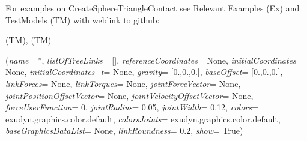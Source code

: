 %
\noindent For examples on CreateSphereTriangleContact see Relevant Examples (Ex) and TestModels (TM) with weblink to github:
\bi
 \item \footnotesize {} (TM), 
 (TM)
\ei

%
\begin{flushleft}
\label{sec:mainsystemextensions:CreateKinematicTree}
({\it name}= '', {\it listOfTreeLinks}= [], {\it referenceCoordinates}= None, {\it initialCoordinates}= None, {\it initialCoordinates\_t}= None, {\it gravity}= [0.,0.,0.], {\it baseOffset}= [0.,0.,0.], {\it linkForces}= None, {\it linkTorques}= None, {\it jointForceVector}= None, {\it jointPositionOffsetVector}= None, {\it jointVelocityOffsetVector}= None, {\it forceUserFunction}= 0, {\it jointRadius}= 0.05, {\it jointWidth}= 0.12, {\it colors}= exudyn.graphics.color.default, {\it colorsJoints}= exudyn.graphics.color.default, {\it baseGraphicsDataList}= None, {\it linkRoundness}= 0.2, {\it show}= True)
\end{flushleft}
\setlength{\itemindent}{0.7cm}
